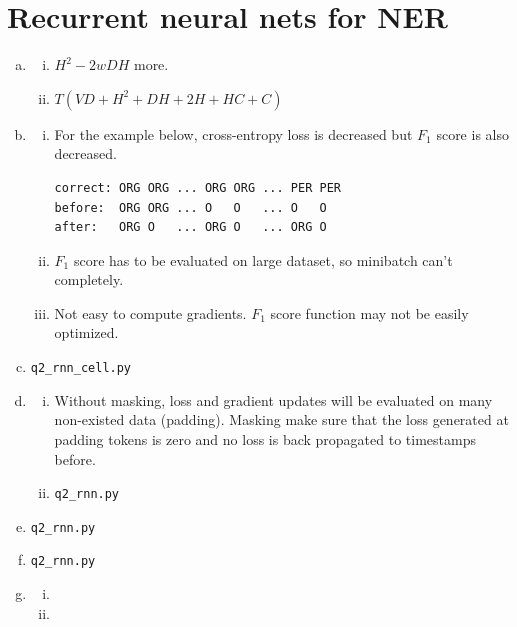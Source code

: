 \documentclass{article}[11pt]
\begin{document}
\section{Recurrent neural nets for NER}
\begin{enumerate}[(a)]
\item
  \begin{enumerate}[i.]
  \item $H^2-2wDH$ more.
  \item $T(VD + H^2 + DH + 2H + HC + C)$
  \end{enumerate}
\item
  \begin{enumerate}[i.]
  \item For the example below, cross-entropy loss is decreased but $F_1$ score
    is also decreased.
\begin{verbatim}
correct: ORG ORG ... ORG ORG ... PER PER
before:  ORG ORG ... O   O   ... O   O
after:   ORG O   ... ORG O   ... ORG O
\end{verbatim}
  \item $F_1$ score has to be evaluated on large dataset, so minibatch can't
    completely.
  \item Not easy to compute gradients. $F_1$ score function may not be easily optimized.
  \end{enumerate}
\item \verb|q2_rnn_cell.py|
\item
  \begin{enumerate}[i.]
  \item Without masking, loss and gradient updates will be evaluated on many
    non-existed data (padding). Masking make sure that the loss generated at
    padding tokens is zero and no loss is back propagated to timestamps before.
  \item \verb|q2_rnn.py|
  \end{enumerate}
  
\item \verb|q2_rnn.py|
\item \verb|q2_rnn.py|
\item
  \begin{enumerate}[i.]
  \item 
  \item 
  \end{enumerate}
\end{enumerate}
\end{document}
